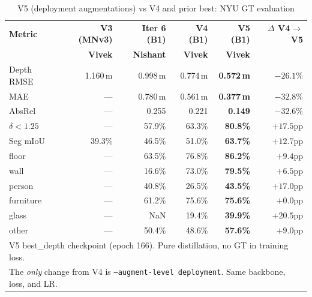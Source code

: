 \documentclass[11pt,a4paper]{article}
\begin{document}
\begin{table}[h]
\centering
\caption{V5 (deployment augmentations) vs V4 and prior best: NYU GT evaluation}
\label{tab:vivek-v5-eval}
\begin{tabular}{lrrrrr}
\toprule
\textbf{Metric} & \textbf{V3 (MNv3)} & \textbf{Iter 6 (B1)} & \textbf{V4 (B1)} & \textbf{V5 (B1)} & \textbf{$\Delta$ V4$\to$V5} \\
                 & \textbf{Vivek}      & \textbf{Nishant}     & \textbf{Vivek}   & \textbf{Vivek}   & \\
\midrule
Depth RMSE       & 1.160\,m & 0.998\,m & 0.774\,m & \textcolor{improved}{\textbf{0.572\,m}} & $-26.1\%$ \\
MAE              & ---      & 0.780\,m & 0.561\,m & \textcolor{improved}{\textbf{0.377\,m}} & $-32.8\%$ \\
AbsRel           & ---      & 0.255    & 0.221    & \textcolor{improved}{\textbf{0.149}}     & $-32.6\%$ \\
$\delta < 1.25$  & ---      & 57.9\%   & 63.3\%   & \textcolor{improved}{\textbf{80.8\%}}   & $+17.5$pp \\
\midrule
Seg mIoU         & 39.3\%   & 46.5\%   & 51.0\%   & \textcolor{improved}{\textbf{63.7\%}}   & $+12.7$pp \\
\quad floor      & ---      & 63.5\%   & 76.8\%   & \textcolor{improved}{\textbf{86.2\%}}   & $+9.4$pp \\
\quad wall       & ---      & 16.6\%   & 73.0\%   & \textcolor{improved}{\textbf{79.5\%}}   & $+6.5$pp \\
\quad person     & ---      & 40.8\%   & 26.5\%   & \textcolor{improved}{\textbf{43.5\%}}   & $+17.0$pp \\
\quad furniture  & ---      & 61.2\%   & 75.6\%   & \textcolor{improved}{\textbf{75.6\%}}   & $+0.0$pp \\
\quad glass      & ---      & NaN      & 19.4\%   & \textcolor{improved}{\textbf{39.9\%}}   & $+20.5$pp \\
\quad other      & ---      & 50.4\%   & 48.6\%   & \textcolor{improved}{\textbf{57.6\%}}   & $+9.0$pp \\
\bottomrule
\multicolumn{6}{l}{\footnotesize V5 best\_depth checkpoint (epoch 166). Pure distillation, no GT in training loss.} \\
\multicolumn{6}{l}{\footnotesize The \emph{only} change from V4 is \texttt{--augment-level deployment}. Same backbone, loss, and LR.} \\
\end{tabular}
\end{table}
\end{document}

